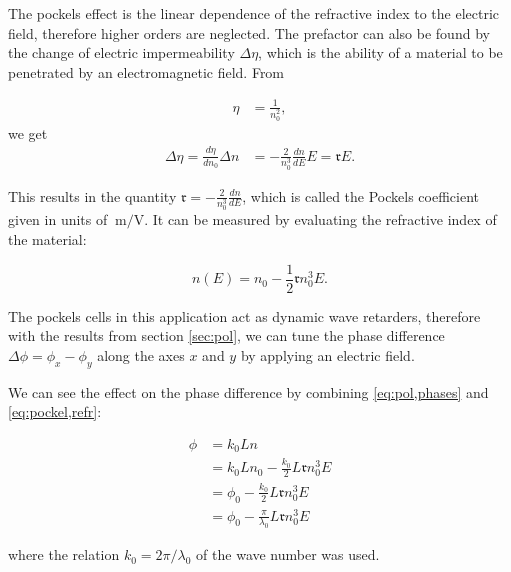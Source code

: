 
The pockels effect is the linear dependence of the refractive index to the electric field, therefore higher orders are neglected. The prefactor can also be found by the change of electric impermeability $\Delta \eta$, which is the ability of a material to be penetrated by an electromagnetic field. From

\begin{align}
	\eta & = \frac{1}{n_0^2},
\end{align}
we get
\begin{align}
	\Delta \eta = \frac{d \eta}{dn_0} \Delta n & = -\frac{2}{n_0^3} \frac{dn}{dE} E = \mathfrak{r} E .
\end{align}
\label{eq:pockel,refr}

This results in the quantity $\mathfrak{r} = -\frac{2}{n_0^3} \frac{dn}{dE}$, which is called the Pockels coefficient given in units of $\SI{}{\meter\per\volt}$. It can be measured by evaluating the refractive index of the material:

\begin{equation}
	n(E) = n_0 - \frac{1}{2} \mathfrak{r} n_0^3 E .
\end{equation}

The pockels cells in this application act as dynamic wave retarders, therefore with the results from section \ref{sec:pol}, we can tune the phase difference $\Delta \phi = \phi_x - \phi_y$ along the axes $x$ and $y$ by applying an electric field.

We can see the effect on the phase difference by combining \ref{eq:pol,phases} and \ref{eq:pockel,refr}:

\begin{align}
	\phi & = k_0 L n \\
		 & = k_0 L n_0 - \frac{k_0}{2} L \mathfrak{r} n_0^3 E \\
		 & = \phi_0 - \frac{k_0}{2} L \mathfrak{r} n_0^3 E \\
		 & = \phi_0 - \frac{\pi}{\lambda_0} L \mathfrak{r} n_0^3 E
\end{align}

where the relation $k_0 = 2 \pi / \lambda_0$ of the wave number was used.


